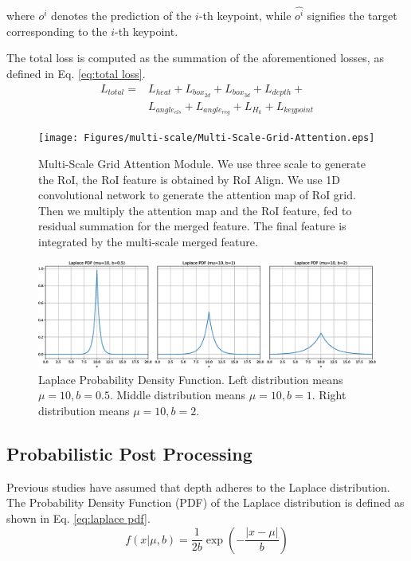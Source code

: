 \documentclass[journal]{IEEEtran}
\begin{document}
	where $o^i$ denotes the prediction of the $i$-th keypoint, while $\hat{o^i}$ signifies the target corresponding to the $i$-th keypoint.
	
	The total loss is computed as the summation of the aforementioned losses, as defined in Eq. \eqref{eq:total loss}.
	\begin{equation}
	\begin{aligned}
		L_{total} =& L_{heat} + L_{box_{2d}} + L_{box_{3d}} + L_{depth} +\\ 
		& L_{angle_{cls}} + L_{angle_{reg}} + L_{H_k} + L_{keypoint}
		\label{eq:total loss}
	\end{aligned}
	\end{equation}
	\begin{figure}
		\centering
		\texttt{[image: Figures/multi-scale/Multi-Scale-Grid-Attention.eps]}
		\caption{Multi-Scale Grid Attention Module. We use three scale to generate the RoI, the RoI feature is obtained by RoI Align. We use 1D convolutional network to generate the attention map of RoI grid. Then we multiply the attention map and the RoI feature, fed to residual summation for the merged feature. The final feature is integrated by the multi-scale merged feature.} 
		\label{fig:multi-scale-grid-attention}
	\end{figure}
	
	\begin{figure}[!t]
		\centering
		\includegraphics[width=1.0\linewidth]{Figures/laplace/laplace_distribution}
		\caption{Laplace Probability Density Function. Left distribution means $\mu=10, b=0.5$. Middle distribution means $\mu=10, b=1$. Right distribution means $\mu=10, b=2$.}
		\label{fig:laplace distribution}
	\end{figure}
	\subsection{Probabilistic Post Processing}\label{post_processing}
		Previous studies have assumed that depth adheres to the Laplace distribution. The Probability Density Function (PDF) of the Laplace distribution is defined as shown in Eq. \eqref{eq:laplace pdf}. 
		\begin{equation}
			f(x|\mu,b)=\frac1{2b}\exp\left(-\frac{|x-\mu|}b\right)
			\label{eq:laplace pdf}
		\end{equation}
		
\end{document}
